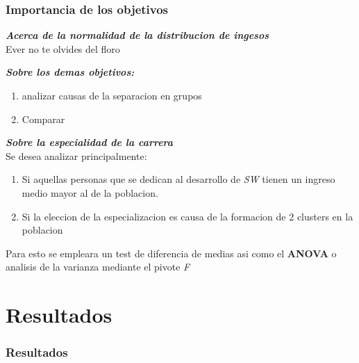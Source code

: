 \documentclass{beamer}
\begin{document}


\frametitle{Importancia de los objetivos}
\begin{frame}
  \textbf{\textit{
    Acerca de la normalidad de la distribucion de ingesos
  }} \\
  \alert{Ever no te olvides del floro}
\end{frame}

\begin{frame}
  \textbf{\textit{
    Sobre los demas objetivos:
  }}
  \\

  \begin{enumerate}
      \item analizar causas de la separacion en grupos
      \item Comparar

  \end{enumerate}

\end{frame}

\begin{frame}
  \textit{\textbf{
    Sobre la especialidad de la carrera
  }}
  \\

  Se desea analizar principalmente:
  \begin{enumerate}
      \item Si aquellas personas que se dedican al desarrollo
        de \textit{SW} tienen un ingreso medio mayor al de la
        poblacion.

      \item Si la eleccion de la especializacion es causa de la
        formacion de 2 clusters en la poblacion
  \end{enumerate}

  Para esto se empleara un test de diferencia de medias asi como
  el \textbf{ANOVA} o analisis de la varianza mediante el pivote
  \textit{F}

\end{frame}
\section{Resultados}
\begin{frame}
\frametitle{Resultados}

\end{frame}
\end{document}
